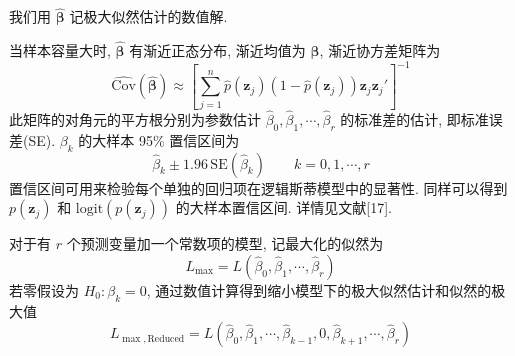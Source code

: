 我们用 $\hat{\boldsymbol{\beta}}$ 记极大似然估计的数值解.

\quad{}\quad 当样本容量大时, $\hat{\boldsymbol{\beta}}$ 有渐近正态分布, 渐近均值为 $\boldsymbol{\beta}$, 渐近协方差矩阵为
\label{eq:11-74}
\begin{equation}
\widehat{\mathrm{Cov}}(\hat{\boldsymbol{\beta}})\approx\left[\sum_{j=1}^{n}\hat{p}(\mathbf{z}_j)(1-\hat{p}(\mathbf{z}_j))\mathbf{z}_j\mathbf{z}_j'\right]^{-1}
\tag{11-74}
\end{equation}
此矩阵的对角元的平方根分别为参数估计 $\hat{\beta}_0,\hat{\beta}_1,\cdots,\hat{\beta}_r$ 的标准差的估计, 即标准误差(SE). $\beta_k$ 的大样本 95\% 置信区间为
\label{eq:11-75}
\begin{equation}
\hat{\beta}_k\pm 1.96\,\mathrm{SE}(\hat{\beta}_k)\qquad k=0,1,\cdots,r
\tag{11-75}
\end{equation}
置信区间可用来检验每个单独的回归项在逻辑斯蒂模型中的显著性. 同样可以得到 $p(\mathbf{z}_j)$ 和 $\mathrm{logit}(p(\mathbf{z}_j))$ 的大样本置信区间. 详情见文献[17].

\quad{}\quad 对于有 $r$ 个预测变量加一个常数项的模型, 记最大化的似然为
\[
L_{\max}=L(\hat{\beta}_0,\hat{\beta}_1,\cdots,\hat{\beta}_r)
\]
若零假设为 $H_0:\beta_k=0$, 通过数值计算得到缩小模型下的极大似然估计和似然的极大值
\[
L_{\max,\mathrm{Reduced}}=L(\hat{\beta}_0,\hat{\beta}_1,\cdots,\hat{\beta}_{k-1},0,\hat{\beta}_{k+1},\cdots,\hat{\beta}_r)
\]

